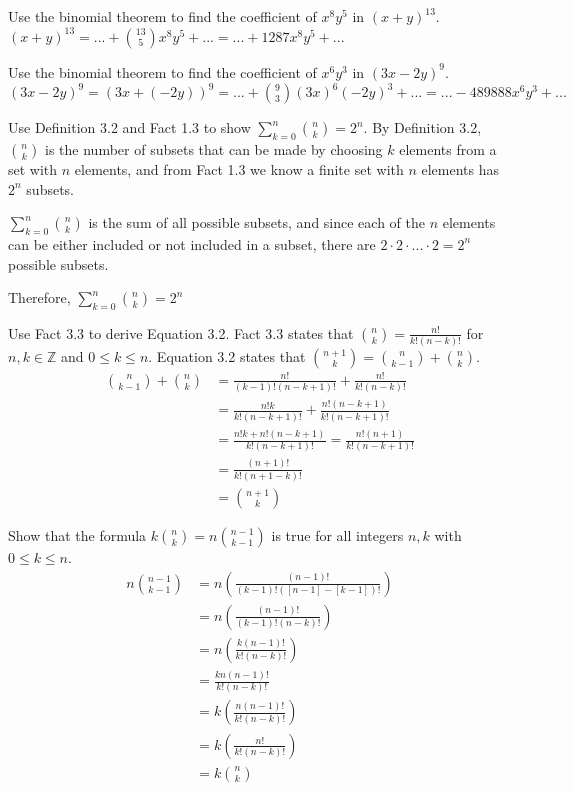 \documentclass[DIN, pagenumber=false, fontsize=11pt, parskip=half]{scrartcl}
\begin{document}
\begin{problems}
    \problem Use the binomial theorem to find the coefficient of $x^8y^5$ in $(x+y)^{13}$.
    \answer $(x + y)^{13} = ... + {13 \choose 5}x^8y^5 + ... = ... + 1287x^8y^5 + ...$

    \problem Use the binomial theorem to find the coefficient of $x^6y^3$ in $(3x-2y)^9$.
    \answer $(3x - 2y)^9 = (3x + (-2y))^9 = ... + {9 \choose 3}(3x)^{6}(-2y)^3 + ... = ... - 489888x^6y^3 + ...$

    \problem Use Definition 3.2 and Fact 1.3 to show $\sum_{k=0}^{n} {n \choose k} = 2^n$.
    \answer By Definition 3.2, ${n \choose k}$ is the number of subsets that can be made by choosing $k$ elements from a set with $n$ elements, and from Fact 1.3 we know a finite set with $n$ elements has $2^n$ subsets.

    $\sum_{k=0}^{n}{n \choose k}$ is the sum of all possible subsets, and since each of the $n$ elements can be either included or not included in a subset, there are $2 \cdot 2 \cdot ... \cdot 2 = 2^n$ possible subsets.

    Therefore, $\sum_{k=0}^{n}{n \choose k} = 2^n$

    \problem Use Fact 3.3 to derive Equation 3.2.
    \answer Fact 3.3 states that ${n \choose k} = \frac{n!}{k!(n-k)!}$ for $n,k \in \mathbb{Z}$ and $0 \leq k \leq n$. Equation 3.2 states that ${n + 1 \choose k} = {n \choose k - 1} + {n \choose k}$.
    \begin{align}
        \nonumber {n \choose k - 1} + {n \choose k} & = \frac{n!}{(k-1)!(n-k+1)!} + \frac{n!}{k!(n-k)!}\\ 
        \nonumber & = \frac{n!k}{k!(n-k+1)!} + \frac{n!(n-k+1)}{k!(n-k+1)!}\\ 
        \nonumber & = \frac{n!k + n!(n-k+1)}{k!(n-k+1)!} = \frac{n!(n+1)}{k!(n-k+1)!}\\
        \nonumber & = \frac{(n+1)!}{k!(n + 1 - k)!}\\ 
        \nonumber & = {n + 1 \choose k}
    \end{align}

    \problem Show that the formula $k{n \choose k} = n{n-1 \choose k-1}$ is true for all integers $n,k$ with $0 \leq k \leq n$.
    \answer
    \begin{align}
        \nonumber n {n-1 \choose k-1} & = n\left(\frac{(n-1)!}{(k-1)!([n-1]-[k-1])!}\right)\\ 
        \nonumber & = n\left(\frac{(n-1)!}{(k-1)!(n-k)!}\right)\\ 
        \nonumber & = n\left(\frac{k(n-1)!}{k!(n-k)!}\right)\\ 
        \nonumber & = \frac{kn(n-1)!}{k!(n-k)!}\\ 
        \nonumber & = k\left(\frac{n(n-1)!}{k!(n-k)!}\right)\\ 
        \nonumber & = k\left(\frac{n!}{k!(n-k)!}\right)\\
        \nonumber & = k{n \choose k}
    \end{align}


\end{problems}
\end{document}
